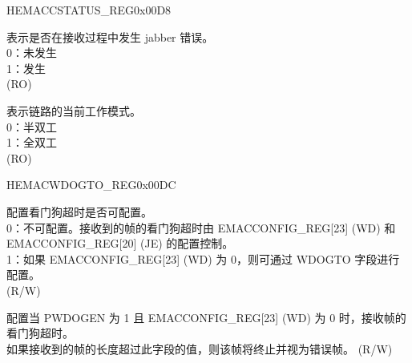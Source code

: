 \begin{register}{H}{EMACCSTATUS\_REG}{0x00D8}\label{regdesc:EMACCSTATUSREG}
%
%
%
%
%
%
\regnewline%
\begin{regdesc}\begin{reglist}
\item [JABBER\_TIMEOUT] 表示是否在接收过程中发生 jabber 错误。\\
0：未发生\\
1：发生\\ (RO)
\item [LINK\_MODE] 表示链路的当前工作模式。\\
0：半双工\\
1：全双工\\ (RO)
\end{reglist}\end{regdesc}
\end{register}

\begin{register}{H}{EMACWDOGTO\_REG}{0x00DC}\label{regdesc:EMACWDOGTOREG}
%
%
%
%
\regnewline%
\begin{regdesc}\begin{reglist}
\item [PWDOGEN] 配置看门狗超时是否可配置。\\
0：不可配置。接收到的帧的看门狗超时由 EMACCONFIG\_REG[23] (WD) 和 EMACCONFIG\_REG[20] (JE) 的配置控制。\\
1：如果 EMACCONFIG\_REG[23] (WD) 为 0，则可通过 WDOGTO 字段进行配置。\\(R/W)
\item [WDOGTO] 配置当 PWDOGEN 为 1 且 EMACCONFIG\_REG[23] (WD) 为 0 时，接收帧的看门狗超时。\\
如果接收到的帧的长度超过此字段的值，则该帧将终止并视为错误帧。 (R/W)
\end{reglist}\end{regdesc}
\end{register}


